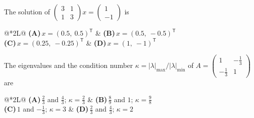\documentclass[11pt,a4paper]{article}
\newcommand{\optlabel}[1]{\textbf{(#1)}}
\newenvironment{qitem}[1]{\begin{list}{}{\setlength{\leftmargin}{3.3em}\setlength{\labelwidth}{3.1em}%
  \setlength{\labelsep}{0.2em}\setlength{\topsep}{3pt}\setlength{\parsep}{3pt}}\item[\textbf{Q.#1}\hfill]}{\end{list}}
\newcommand{\qsep}{\par\vspace{2pt}{\color{black!15}\hrule}\vspace{4pt}}
\begin{document}
\begin{qitem}{1}
The solution of $\begin{pmatrix}3 & 1\\ 1 & 3\end{pmatrix}x = \begin{pmatrix}1\\ -1\end{pmatrix}$ is
\par\smallskip\noindent\begin{tabularx}{\linewidth}{@{}*{2}{L}@{}}
\optlabel{A}\,$x = (0.5,\ 0.5)^{\mathsf T}$ & \optlabel{B}\,$x = (0.5,\ -0.5)^{\mathsf T}$ \\[3pt]
\optlabel{C}\,$x = (0.25,\ -0.25)^{\mathsf T}$ & \optlabel{D}\,$x = (1,\ -1)^{\mathsf T}$
\end{tabularx}
\end{qitem}
\qsep

\begin{qitem}{2}
The eigenvalues and the condition number $\kappa = |\lambda|_{\max}/|\lambda|_{\min}$ of $A = \begin{pmatrix}1 & -\tfrac13\\ -\tfrac13 & 1\end{pmatrix}$ are
\par\smallskip\noindent\begin{tabularx}{\linewidth}{@{}*{2}{L}@{}}
\optlabel{A}\,$\tfrac23$ and $\tfrac43$; $\kappa = \tfrac23$ & \optlabel{B}\,$\tfrac89$ and $1$; $\kappa = \tfrac98$ \\[3pt]
\optlabel{C}\,$1$ and $-\tfrac13$; $\kappa = 3$ & \optlabel{D}\,$\tfrac23$ and $\tfrac43$; $\kappa = 2$
\end{tabularx}
\end{qitem}
\qsep
\end{document}
